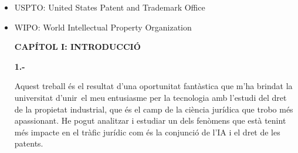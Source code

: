\documentclass[12pt]{article}
\renewcommand{\_}{\kern-1.5pt\textunderscore\kern-1.5pt}
\begin{document}
\begin{itemize}
\vspace{\baselineskip}
	\item USPTO: United States Patent and Trademark Office\par


\vspace{\baselineskip}
	\item WIPO: World Intellectual Property Organization\par


\vspace{\baselineskip}

\vspace{\baselineskip}

\vspace{\baselineskip}

\vspace{\baselineskip}

\vspace{\baselineskip}

\vspace{\baselineskip}

\vspace{\baselineskip}

\vspace{\baselineskip}

\vspace{\baselineskip}

\vspace{\baselineskip}

\vspace{\baselineskip}

\vspace{\baselineskip}
\begin{Center}
{\fontsize{16pt}{19.2pt}\selectfont \textbf{CAPÍTOL I: INTRODUCCIÓ}\par}
\end{Center}\par


\vspace{\baselineskip}
\begin{justify}
\textbf{1.- }
\end{justify}\par


\vspace{\baselineskip}
\begin{justify}

\end{justify}\par


\vspace{\baselineskip}
\begin{justify}
Aquest treball és el resultat d’una oportunitat fantàstica que m’ha brindat la universitat d’unir\ el meu entusiasme per la tecnologia amb l’estudi del dret de la propietat industrial, que és el camp de la ciència jurídica que trobo més apassionant.  He pogut analitzar i estudiar un dels fenòmens que està tenint més impacte en el tràfic jurídic com és la conjunció de l’IA i el dret de les patents. 
\end{justify}\par



\end{itemize}
\end{document}
